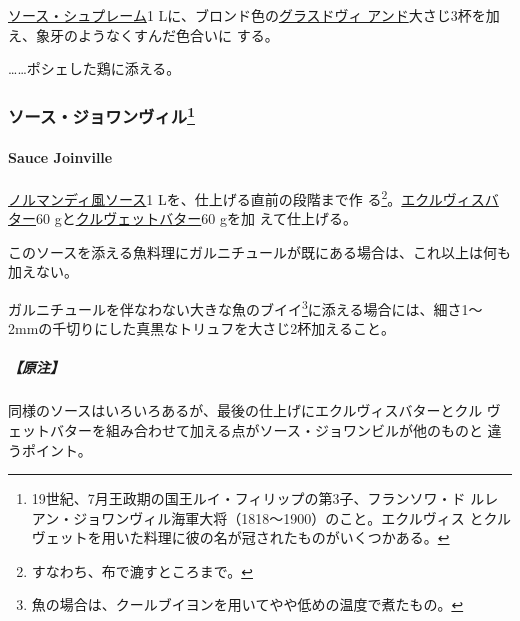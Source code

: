 \begin{recette}

\protect\hyperlink{sauce-supreme}{ソース・シュプレーム}1
Lに、ブロンド色の\protect\hyperlink{glace-de-viande}{グラスドヴィ
アンド}大さじ3杯を加え、象牙のようなくすんだ色合いに する。

\ldots{}\ldots{}ポシェした鶏に添える。

\maeaki

\hypertarget{ux30bdux30fcux30b9ux30b8ux30e7ux30efux30f3ux30f4ux30a3ux30eb61}{%
\subsubsection[ソース・ジョワンヴィル]{\texorpdfstring{ソース・ジョワンヴィル\footnote{19世紀、7月王政期の国王ルイ・フィリップの第3子、フランソワ・ド
  ルレアン・ジョワンヴィル海軍大将（1818〜1900）のこと。エクルヴィス
  とクルヴェットを用いた料理に彼の名が冠されたものがいくつかある。}}{ソース・ジョワンヴィル}}\label{ux30bdux30fcux30b9ux30b8ux30e7ux30efux30f3ux30f4ux30a3ux30eb61}}

\hypertarget{sauce-joinville}{%
\paragraph{Sauce Joinville}\label{sauce-joinville}}


\protect\hyperlink{sauce-normande}{ノルマンディ風ソース}1
Lを、仕上げる直前の段階まで作 る\footnote{すなわち、布で漉すところまで。}。\protect\hyperlink{}{エクルヴィスバター}60
gと\protect\hyperlink{}{クルヴェットバター}60 gを加 えて仕上げる。

このソースを添える魚料理にガルニチュールが既にある場合は、これ以上は何も加えない。

ガルニチュールを伴なわない大きな魚のブイイ\footnote{魚の場合は、クールブイヨンを用いてやや低めの温度で煮たもの。}に添える場合には、細さ1〜
2mmの千切りにした真黒なトリュフを大さじ2杯加えること。

\hypertarget{ux539fux6ce8-11}{%
\subparagraph{【原注】}\label{ux539fux6ce8-11}}

同様のソースはいろいろあるが、最後の仕上げにエクルヴィスバターとクル
ヴェットバターを組み合わせて加える点がソース・ジョワンビルが他のものと
違うポイント。


\end{recette}
